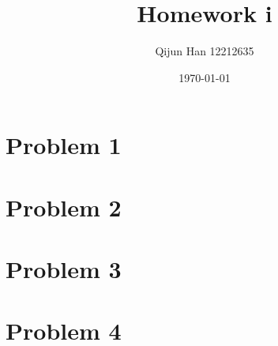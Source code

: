 \documentclass[12pt,a4paper]{article}
\title{Homework i} %
\author{Qijun Han 12212635}
\date{\today}
\begin{document}
\maketitle

\section{Problem 1}

\section{Problem 2}

\section{Problem 3}

\section{Problem 4}
\end{document}

